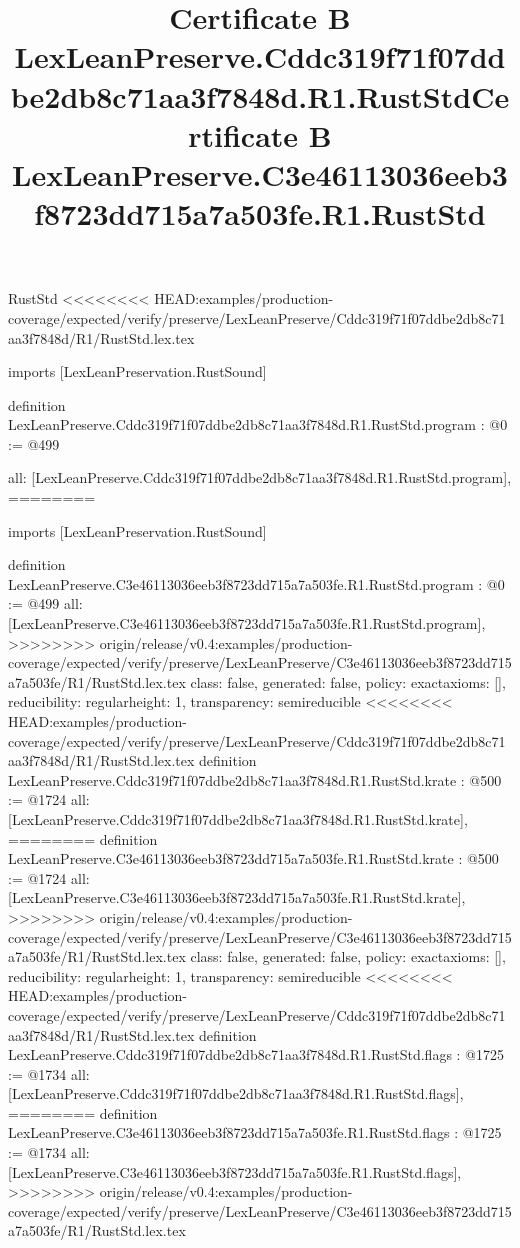 \begin{lexlean}{RustStd}
<<<<<<<< HEAD:examples/production-coverage/expected/verify/preserve/LexLeanPreserve/Cddc319f71f07ddbe2db8c71aa3f7848d/R1/RustStd.lex.tex
\title{Certificate B LexLeanPreserve.Cddc319f71f07ddbe2db8c71aa3f7848d.R1.RustStd}
\begin{coremodule}
imports [LexLeanPreservation.RustSound]

definition LexLeanPreserve.Cddc319f71f07ddbe2db8c71aa3f7848d.R1.RustStd.program : @0 := @499 {
  all: [LexLeanPreserve.Cddc319f71f07ddbe2db8c71aa3f7848d.R1.RustStd.program],
========
\title{Certificate B LexLeanPreserve.C3e46113036eeb3f8723dd715a7a503fe.R1.RustStd}
\begin{coremodule}
imports [LexLeanPreservation.RustSound]

definition LexLeanPreserve.C3e46113036eeb3f8723dd715a7a503fe.R1.RustStd.program : @0 := @499 {
  all: [LexLeanPreserve.C3e46113036eeb3f8723dd715a7a503fe.R1.RustStd.program],
>>>>>>>> origin/release/v0.4:examples/production-coverage/expected/verify/preserve/LexLeanPreserve/C3e46113036eeb3f8723dd715a7a503fe/R1/RustStd.lex.tex
  class: false,
  generated: false,
  policy: exact{axioms: []},
  reducibility: regular{height: 1},
  transparency: semireducible
}
<<<<<<<< HEAD:examples/production-coverage/expected/verify/preserve/LexLeanPreserve/Cddc319f71f07ddbe2db8c71aa3f7848d/R1/RustStd.lex.tex
definition LexLeanPreserve.Cddc319f71f07ddbe2db8c71aa3f7848d.R1.RustStd.krate : @500 := @1724 {
  all: [LexLeanPreserve.Cddc319f71f07ddbe2db8c71aa3f7848d.R1.RustStd.krate],
========
definition LexLeanPreserve.C3e46113036eeb3f8723dd715a7a503fe.R1.RustStd.krate : @500 := @1724 {
  all: [LexLeanPreserve.C3e46113036eeb3f8723dd715a7a503fe.R1.RustStd.krate],
>>>>>>>> origin/release/v0.4:examples/production-coverage/expected/verify/preserve/LexLeanPreserve/C3e46113036eeb3f8723dd715a7a503fe/R1/RustStd.lex.tex
  class: false,
  generated: false,
  policy: exact{axioms: []},
  reducibility: regular{height: 1},
  transparency: semireducible
}
<<<<<<<< HEAD:examples/production-coverage/expected/verify/preserve/LexLeanPreserve/Cddc319f71f07ddbe2db8c71aa3f7848d/R1/RustStd.lex.tex
definition LexLeanPreserve.Cddc319f71f07ddbe2db8c71aa3f7848d.R1.RustStd.flags : @1725 := @1734 {
  all: [LexLeanPreserve.Cddc319f71f07ddbe2db8c71aa3f7848d.R1.RustStd.flags],
========
definition LexLeanPreserve.C3e46113036eeb3f8723dd715a7a503fe.R1.RustStd.flags : @1725 := @1734 {
  all: [LexLeanPreserve.C3e46113036eeb3f8723dd715a7a503fe.R1.RustStd.flags],
>>>>>>>> origin/release/v0.4:examples/production-coverage/expected/verify/preserve/LexLeanPreserve/C3e46113036eeb3f8723dd715a7a503fe/R1/RustStd.lex.tex
}}}
\end{coremodule}}
\end{coremodule}
\end{lexlean}
